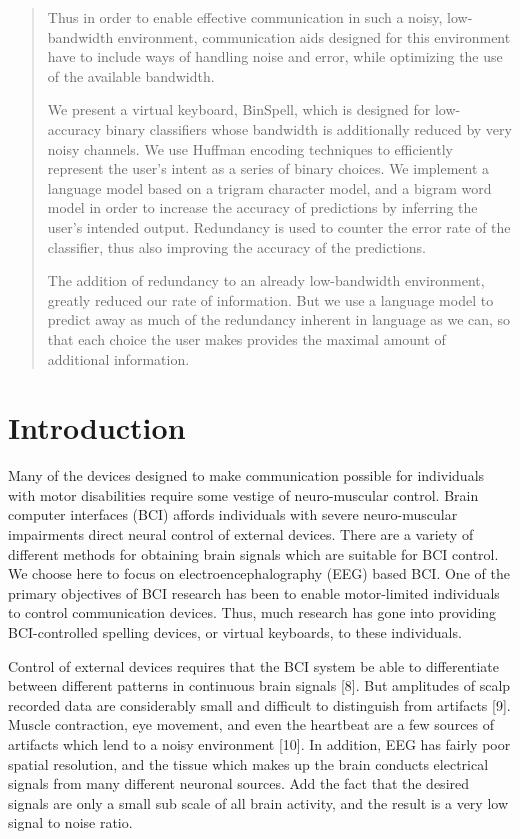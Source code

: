 \documentclass[12pt,titlepage]{article}
\begin{document}
\begin{abstract}
Thus in order to enable effective communication in such a noisy, low-bandwidth environment, 
communication aids designed for this environment have to include ways of handling noise and 
error, while optimizing the use of the available bandwidth.

We present a virtual keyboard, BinSpell, which is designed for low-accuracy binary classifiers 
whose bandwidth is additionally reduced by very noisy channels.  We use Huffman encoding 
techniques to efficiently represent the user's intent as a series of binary choices.  We implement 
a language model based on a trigram character model, and a bigram word model in order to 
increase the accuracy of predictions by inferring the user's intended output. Redundancy is used 
to counter the error rate of the classifier, thus also improving the accuracy of the predictions.

The addition of redundancy to an already low-bandwidth environment, greatly reduced our rate 
of information. But we use a language model to predict away as much of the redundancy 
inherent in language as we can, so that each choice the user makes provides the maximal 
amount of additional information.
\end{abstract}


\section{Introduction}

Many of the devices designed to make communication possible for individuals with motor 
disabilities require some vestige of neuro-muscular control.  Brain computer interfaces (BCI) 
affords individuals with severe neuro-muscular impairments direct neural control of external 
devices.  There are a variety of different methods for obtaining brain signals which are suitable 
for BCI control.  We choose here to focus on electroencephalography (EEG) based BCI.  One of the 
primary objectives of BCI research has been to enable motor-limited individuals to control 
communication devices.  Thus, much research has gone into providing BCI-controlled spelling 
devices, or virtual keyboards, to these individuals.

Control of external devices requires that the BCI system be able to differentiate between 
different patterns in continuous brain signals [8].  But amplitudes of scalp recorded data are considerably 
small and difficult to distinguish from artifacts [9].  Muscle contraction, eye movement, and even 
the heartbeat are a few sources of artifacts which lend to a noisy environment [10].  In addition, 
EEG has fairly poor spatial resolution, and the tissue which makes up the brain conducts 
electrical signals from many different neuronal sources.  Add the fact that the desired signals 
are only a small sub scale of all brain activity, and the result is a very low signal to noise ratio.
\end{document}
